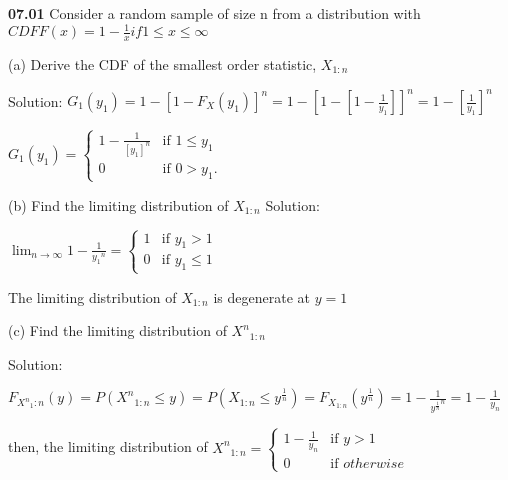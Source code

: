 {\bf 07.01} Consider a random sample of size n from a distribution with $CDF F(x) = 1-\frac{1}{x} if 1 \leq x \leq \infty$

\vspace{5mm}

(a)  Derive the CDF of the smallest order statistic, $X_{1 \colon n}$

\vspace{3mm}
Solution: $G_{1}(y_1) = 1-[1-F_X(y_1)]^n  = 1-[1-[1-\frac{1}{y_1}]]^n = 1-[\frac{1}{y_1}]^n$

\vspace{2mm}
$G_1(y_1) = \begin{cases} 1-\frac{1}{[y_1]^n} &\mbox{if }  1\leq y_1 \\ 0 &\mbox{if } 0>y_1. \end{cases} $


\vspace{10mm}
(b) Find the limiting distribution of $ X_{1\colon{n}}$
\vspace{3mm}
Solution: 

\vspace{2mm}
$\lim_{n \rightarrow \infty} 1-\frac{1}{{y_1}^n} = \begin{cases} 1 &\mbox{if } y_{1} > 1 \\ 0 &\mbox{if } y_1 \leq 1 \end{cases}$

\vspace{2mm}
The limiting distribution of $X_{1\colon n}$ is degenerate at $y = 1$

\vspace{10mm}
(c) Find the limiting distribution of ${X^n}_{1\colon n}$

\vspace{3mm}
Solution:

\vspace{2mm}
$F_{{X^n}_1\colon n} (y) = P({X^n}_{1\colon n} \leq y) = P(X_{1\colon n} \leq y^{\frac{1}{n}}) = F_{X_{1\colon n}} (y^{\frac{1}{n}}) = 1-\frac{1}{{y^\frac{1}{n}}^n} = 1 - \frac{1}{y_n}$

\vspace{2mm}
then, the limiting distribution of ${X^n}_{1\colon n} = \begin{cases} 1- \frac{1}{y_n} &\mbox {if } y >1 \\ 0 &\mbox {if } otherwise \end{cases}$
